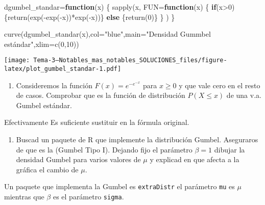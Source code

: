 \documentclass[
]{article}
\newenvironment{Shaded}{\begin{snugshade}}{\end{snugshade}}
\newcommand{\AttributeTok}[1]{\textcolor[rgb]{0.77,0.63,0.00}{#1}}
\newcommand{\ControlFlowTok}[1]{\textcolor[rgb]{0.13,0.29,0.53}{\textbf{#1}}}
\newcommand{\DecValTok}[1]{\textcolor[rgb]{0.00,0.00,0.81}{#1}}
\newcommand{\FunctionTok}[1]{\textcolor[rgb]{0.00,0.00,0.00}{#1}}
\newcommand{\NormalTok}[1]{#1}
\newcommand{\OtherTok}[1]{\textcolor[rgb]{0.56,0.35,0.01}{#1}}
\newcommand{\SpecialCharTok}[1]{\textcolor[rgb]{0.00,0.00,0.00}{#1}}
\newcommand{\StringTok}[1]{\textcolor[rgb]{0.31,0.60,0.02}{#1}}
\providecommand{\tightlist}{%
  \setlength{\itemsep}{0pt}\setlength{\parskip}{0pt}}
\begin{document}
\begin{Shaded}
\begin{Highlighting}[]
\NormalTok{dgumbel\_standar}\OtherTok{=}\ControlFlowTok{function}\NormalTok{(x) \{}
  \FunctionTok{sapply}\NormalTok{(x,}
         \AttributeTok{FUN=}\ControlFlowTok{function}\NormalTok{(x) \{}
           \ControlFlowTok{if}\NormalTok{(x}\SpecialCharTok{\textgreater{}}\DecValTok{0}\NormalTok{) \{}\FunctionTok{return}\NormalTok{(}\FunctionTok{exp}\NormalTok{(}\SpecialCharTok{{-}}\FunctionTok{exp}\NormalTok{(}\SpecialCharTok{{-}}\NormalTok{x))}\SpecialCharTok{*}\FunctionTok{exp}\NormalTok{(}\SpecialCharTok{{-}}\NormalTok{x))\} }\ControlFlowTok{else}\NormalTok{ \{}\FunctionTok{return}\NormalTok{(}\DecValTok{0}\NormalTok{)\}}
\NormalTok{         \}}
\NormalTok{  )}
\NormalTok{  \}}

\FunctionTok{curve}\NormalTok{(}\FunctionTok{dgumbel\_standar}\NormalTok{(x),}\AttributeTok{col=}\StringTok{"blue"}\NormalTok{,}\AttributeTok{main=}\StringTok{"Densidad  Gummbel estándar"}\NormalTok{,}\AttributeTok{xlim=}\FunctionTok{c}\NormalTok{(}\DecValTok{0}\NormalTok{,}\DecValTok{10}\NormalTok{))}
\end{Highlighting}
\end{Shaded}

\texttt{[image: Tema-3---Notables\_mas\_notables\_SOLUCIONES\_files/figure-latex/plot\_gumbel\_standar-1.pdf]}

\begin{enumerate}
\def\labelenumi{\alph{enumi})}
\setcounter{enumi}{1}
\tightlist
\item
  Consideremos la función \(F(x)=e^{-e^{-x}}\) para \(x\geq 0\) y que
  vale cero en el resto de casos. Comprobar que es la función de
  distribución \(P(X\leq x)\) de una v.a. Gumbel estándar.
\end{enumerate}

Efectivamente Es suficiente sustituir en la fórmula original.

\begin{enumerate}
\def\labelenumi{\alph{enumi})}
\setcounter{enumi}{2}
\tightlist
\item
  Buscad un paquete de R que implemente la distribución Gumbel.
  Aseguraros de que es la (Gumbel Tipo I). Dejando fijo el parámetro
  \(\beta=1\) dibujar la densidad Gumbel para varios valores de \(\mu\)
  y explicad en que afecta a la gráfica el cambio de \(\mu\).
\end{enumerate}

Un paquete que implementa la Gumbel es \texttt{extraDistr} el parámetro
\texttt{mu} es \(\mu\) mientras que \(\beta\) es el parámetro
\texttt{sigma}.
\end{document}
